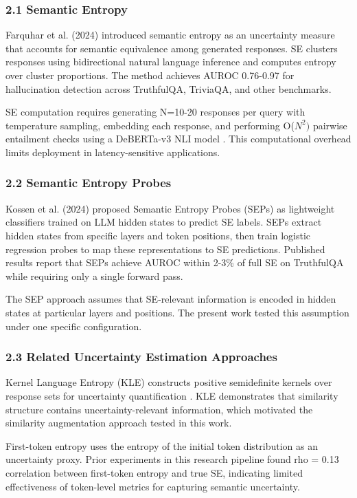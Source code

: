 
\subsubsection{2.1 Semantic Entropy}

Farquhar et al. (2024) introduced semantic entropy as an uncertainty measure that accounts for semantic equivalence among generated responses. SE clusters responses using bidirectional natural language inference and computes entropy over cluster proportions. The method achieves AUROC 0.76-0.97 for hallucination detection across TruthfulQA, TriviaQA, and other benchmarks.

SE computation requires generating N=10-20 responses per query with temperature sampling, embedding each response, and performing O($N^{2})$ pairwise entailment checks using a DeBERTa-v3 NLI model \citep{He2021DeBERTa}. This computational overhead limits deployment in latency-sensitive applications.

\subsubsection{2.2 Semantic Entropy Probes}

Kossen et al. (2024) proposed Semantic Entropy Probes (SEPs) as lightweight classifiers trained on LLM hidden states to predict SE labels. SEPs extract hidden states from specific layers and token positions, then train logistic regression probes to map these representations to SE predictions. Published results report that SEPs achieve AUROC within 2-3\% of full SE on TruthfulQA while requiring only a single forward pass.

The SEP approach assumes that SE-relevant information is encoded in hidden states at particular layers and positions. The present work tested this assumption under one specific configuration.

\subsubsection{2.3 Related Uncertainty Estimation Approaches}

Kernel Language Entropy (KLE) constructs positive semidefinite kernels over response sets for uncertainty quantification \citep{Nikitin2024Kernel}. KLE demonstrates that similarity structure contains uncertainty-relevant information, which motivated the similarity augmentation approach tested in this work.

First-token entropy uses the entropy of the initial token distribution as an uncertainty proxy. Prior experiments in this research pipeline found rho = 0.13 correlation between first-token entropy and true SE, indicating limited effectiveness of token-level metrics for capturing semantic uncertainty.
